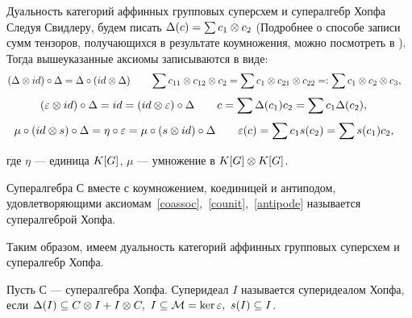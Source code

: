 \begin{subsection}{Дуальность категорий аффинных групповых суперсхем и супералгебр Хопфа}
  Следуя Свидлеру, будем писать $ \Delta(c) = \sum c_1 \otimes c_2 $ 
  (Подробнее о способе записи сумм тензоров, получающихся в результате
  коумножения, можно посмотреть в \cite{sweedler}).
  Тогда вышеуказанные аксиомы записываются в виде:
  \begin{align*}
    (\Delta \otimes id) \circ \Delta = \Delta \circ (id \otimes \Delta) & \qquad
    \sum c_{11} \otimes c_{12} \otimes c_2 = \sum c_1 \otimes c_{21} \otimes c_{22} =: \sum c_1 \otimes c_2 \otimes c_3,
  \end{align*}
  \begin{align*}
    (\varepsilon \otimes id) \circ \Delta = id = (id \otimes \varepsilon) \circ \Delta & \qquad
    c = \sum \Delta(c_1) c_2 = \sum c_1 \Delta(c_2),
  \end{align*}
  \begin{align*}
    \mu \circ (id \otimes s) \circ \Delta = \eta \circ \varepsilon = \mu \circ (s \otimes id) \circ \Delta & \qquad
    \varepsilon (c) = \sum c_1 s(c_2) = \sum s(c_1) c_2,
  \end{align*}

  где $ \eta $ --- единица $ K[G] $, $ \mu $ --- умножение в $ K[G] \otimes K[G] $.

  \begin{definition}
    Супералгебра $ С $ вместе с коумножением, коединицей и антиподом,
    удовлетворяющими аксиомам~\ref{coassoc},~\ref{counit},~\ref{antipode}
    называется супералгеброй Хопфа.
  \end{definition}

  Таким образом, имеем дуальность категорий аффинных групповых суперсхем
  и супералгебр Хопфа.

  \begin{definition}
    Пусть $ С $ --- супералгебра Хопфа. Суперидеал $ I $ называется суперидеалом Хопфа,
    если $ \Delta (I) \subseteq C \otimes I + I \otimes C, ~I \subseteq \mathcal{M} = \ker\varepsilon, ~s(I) \subseteq I $.
  \end{definition}

\end{subsection}